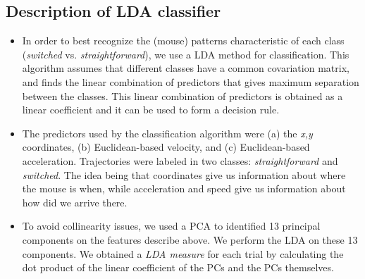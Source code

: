 \documentclass{article}
\newcommand{\addMM}[1]{{\leavevmode\color{red}#1}}
\begin{document}
\subsection{Description of LDA classifier}
\begin{itemize}
\item In order to best recognize the (mouse) patterns characteristic of each class (\textit{switched} vs. \textit{straightforward}), we use a LDA method for classification. This algorithm assumes that different classes have a common covariation matrix, and finds the linear combination of predictors that gives maximum separation between the classes.
This linear combination of predictors is obtained as a linear coefficient and it can be used to form a decision rule. 

\item The predictors used by the classification algorithm were (a) the \textit{x,y} coordinates, (b) Euclidean-based velocity, and (c) Euclidean-based acceleration. Trajectories were labeled in two classes: \emph{straightforward} and \emph{switched}. \addMM{The idea being that coordinates give us information about where the mouse is when, while acceleration and speed give us information about how did we arrive there.}

\item To avoid collinearity issues, we used a PCA to identified 13 principal components on the features describe above. We perform the LDA on these 13 components. 
We obtained a \emph{LDA measure} for each trial by calculating the dot product of the linear coefficient of the PCs and the PCs themselves. 


\end{itemize}
\end{document}

